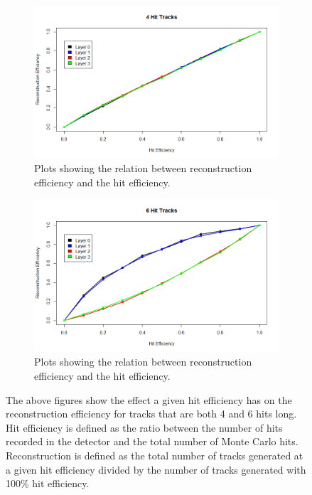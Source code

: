 \begin{figure}
    \centering
    \begin{subfigure}{.5\textwidth}
        \centering
        \includegraphics[scale=0.3]{fig/eff/4.png}
        \caption{Plots showing the relation between reconstruction efficiency and the hit efficiency.}
        \label{fig:eff4}
    \end{subfigure}%
    \begin{subfigure}{.5\textwidth}
        \centering
        \includegraphics[scale=0.3]{fig/eff/6.png}
        \caption{Plots showing the relation between reconstruction efficiency and the hit efficiency.}
        \label{fig:eff6}
    \end{subfigure}
    \caption{The above figures show the effect a given hit efficiency has on the reconstruction efficiency for tracks that are both 4 and 6 hits long. Hit efficiency is defined as the ratio between the number of hits recorded in the detector and the total number of Monte Carlo hits. Reconstruction is defined as the total number of tracks generated at a given hit efficiency divided by the number of tracks generated with 100\% hit efficiency.}
    \label{fig:hit_eff}
\end{figure}
